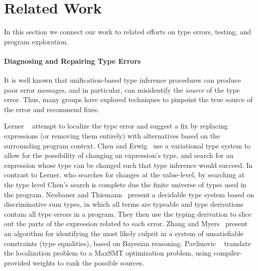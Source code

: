 \section{Related Work}
\label{sec:related-work}
In this section we connect our work to related efforts on type errors,
testing, and program exploration.


\paragraph{Diagnosing and Repairing Type Errors}
\label{sec:diagnosis-repair}
It is well known that unification-based type inference procedures can
produce poor error messages, and in particular, can misidentify the
\emph{source} of the type error.
%
Thus, many groups have explored techniques to pinpoint the true source
of the error and recommend fixes.

Lerner \etal~\cite{Lerner2007-dt} attempt to localize the type
error and suggest a fix by replacing expressions (or removing them
entirely) with alternatives based on the surrounding program context.
%
Chen and Erwig~\cite{Chen2014-gd} use a variational type
system to allow for the possibility of changing an expression's type,
and search for an expression whose type can be changed such that type
inference would succeed.
%
%
In contrast to Lerner, who searches for changes at the
value-level, by searching at the type level Chen's search is complete due
the finite universe of types used in the program.
%
Neubauer and Thiemann~\cite{Neubauer2003-xv} present a
decidable type system based on discriminative sum types, in which all
terms are typeable and type derivations contain all type errors in a
program. They then use the typing derivation to slice out the parts of
the expression related to each error.
%
Zhang and Myers~\cite{Zhang2014-lv,Zhang2015-yu} present an algorithm for
identifying the most likely culprit in a system of unsatisfiable
constraints (\eg type equalities), based on Bayesian reasoning.
%
Pavlinovic \etal~\cite{Pavlinovic2014-mr} translate the %
localization problem to a MaxSMT optimization problem, using
compiler-provided weights to rank the possible sources.

